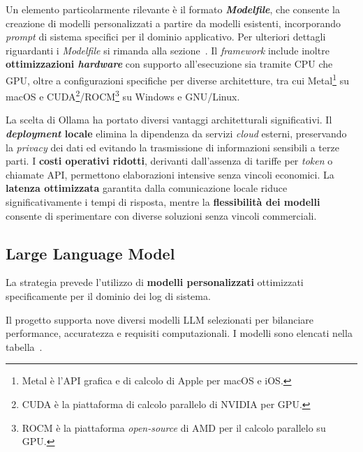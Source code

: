\documentclass[12pt,twoside]{report}
\begin{document}
Un elemento particolarmente rilevante è il formato \textit{\textbf{Modelfile}}, che consente la creazione di modelli personalizzati a partire da modelli esistenti, incorporando \textit{prompt} di sistema specifici per il dominio applicativo. Per ulteriori dettagli riguardanti i \textit{Modelfile} si rimanda alla sezione~. Il \textit{framework} include inoltre \textbf{ottimizzazioni \textit{hardware}} con supporto all'esecuzione sia tramite CPU che GPU, oltre a configurazioni specifiche per diverse architetture, tra cui Metal\footnote{Metal è l'API grafica e di calcolo di Apple per macOS e iOS.} su macOS e CUDA\footnote{CUDA è la piattaforma di calcolo parallelo di NVIDIA per GPU.}/ROCM\footnote{ROCM è la piattaforma \textit{open-source} di AMD per il calcolo parallelo su GPU.} su Windows e GNU/Linux.

La scelta di Ollama ha portato diversi vantaggi architetturali significativi. Il \textbf{\textit{deployment} locale} elimina la dipendenza da servizi \textit{cloud} esterni, preservando la \textit{privacy} dei dati ed evitando la trasmissione di informazioni sensibili a terze parti. I \textbf{costi operativi ridotti}, derivanti dall'assenza di tariffe per \textit{token} o chiamate API, permettono elaborazioni intensive senza vincoli economici. La \textbf{latenza ottimizzata} garantita dalla comunicazione locale riduce significativamente i tempi di risposta, mentre la \textbf{flessibilità dei modelli} consente di sperimentare con diverse soluzioni senza vincoli commerciali.

\subsection{Large Language Model}
\label{subsec:llm}

La strategia prevede l'utilizzo di \textbf{modelli personalizzati} ottimizzati specificamente per il dominio dei log di sistema.

Il progetto supporta nove diversi modelli LLM selezionati per bilanciare performance, accuratezza e requisiti computazionali. I modelli sono elencati nella tabella~.
\end{document}
